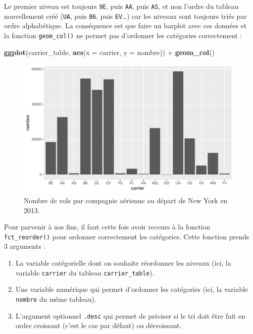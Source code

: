 \documentclass[
  a4paper,
]{article}
\newenvironment{Shaded}{\begin{snugshade}}{\end{snugshade}}
\newcommand{\DataTypeTok}[1]{\textcolor[rgb]{0.00,0.34,0.68}{#1}}
\newcommand{\KeywordTok}[1]{\textcolor[rgb]{0.12,0.11,0.11}{\textbf{#1}}}
\newcommand{\NormalTok}[1]{\textcolor[rgb]{0.12,0.11,0.11}{#1}}
\newcommand{\OperatorTok}[1]{\textcolor[rgb]{0.12,0.11,0.11}{#1}}
\newcommand{\StringTok}[1]{\textcolor[rgb]{0.75,0.01,0.01}{#1}}
\providecommand{\tightlist}{%
  \setlength{\itemsep}{0pt}\setlength{\parskip}{0pt}}
\begin{document}
Le premier niveau est toujours \texttt{9E}, puis \texttt{AA}, puis \texttt{AS}, et non l'ordre du tableau nouvellement créé (\texttt{UA}, puis \texttt{B6}, puis \texttt{EV}\ldots) car les niveaux sont toujours triés par ordre alphabétique. La conséquence est que faire un barplot avec ces données et la fonction \texttt{geom\_col()} ne permet pas d'ordonner les catégories correctement :

\begin{Shaded}
\begin{Highlighting}[]
\KeywordTok{ggplot}\NormalTok{(carrier_table, }\KeywordTok{aes}\NormalTok{(}\DataTypeTok{x =}\NormalTok{ carrier, }\DataTypeTok{y =}\NormalTok{ nombre)) }\OperatorTok{+}
\StringTok{  }\KeywordTok{geom_col}\NormalTok{()}
\end{Highlighting}
\end{Shaded}

\begin{figure}[htpb]

{\centering \includegraphics[width=0.9\linewidth]{figure/bpcarriercol-1} 

}

\caption{Nombre de vols par compagnie aérienne au départ de New York en 2013.}\label{fig:bpcarriercol}
\end{figure}

Pour parvenir à nos fins, il faut cette fois avoir recours à la fonction \texttt{fct\_reorder()} pour ordonner correctement les catégories. Cette fonction prends 3 arguments :

\begin{enumerate}
\def\labelenumi{\arabic{enumi}.}
\tightlist
\item
  La variable catégorielle dont on souhaite réordonner les niveaux (ici, la variable \texttt{carrier} du tableau \texttt{carrier\_table}).
\item
  Une variable numérique qui permet d'ordonner les catégories (ici, la variable \texttt{nombre} du même tableau).
\item
  L'argument optionnel \texttt{.desc} qui permet de préciser si le tri doit être fait en ordre croissant (c'est le cas par défaut) ou décroissant.
\end{enumerate}
\end{document}
